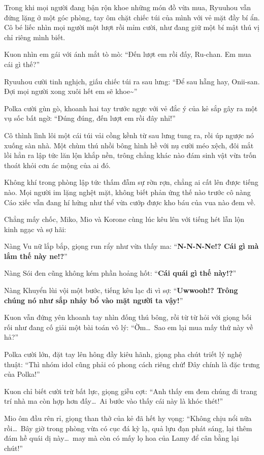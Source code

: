 \documentclass[../main.tex]{subfiles}
\begin{document}
Trong khi mọi người đang bận rộn khoe những món đồ vừa mua, Ryuuhou vẫn đứng lặng ở một góc phòng, tay ôm chặt chiếc túi của mình với vẻ mặt đầy bí ẩn. Cô bé liếc nhìn mọi người một lượt rồi mỉm cười, như đang giữ một bí mật thú vị chỉ riêng mình biết.

Kuon nhìn em gái với ánh mắt tò mò: ``Đến lượt em rồi đấy, Ru-chan. Em mua cái gì thế?''

Ryuuhou cười tinh nghịch, giấu chiếc túi ra sau lưng: ``Để sau hẵng hay, Onii-san. Đợi mọi người xong xuôi hết em sẽ khoe\~{}''

Polka cười gùn gò, khoanh hai tay trước ngực với vẻ đắc ý của kẻ sắp gây ra một vụ sốc bất ngờ: ``Đúng đúng, đến lượt em rồi đây nhỉ!''

Cô thình lình lôi một cái túi vải cồng kềnh từ sau lưng tung ra, rồi úp ngược nó xuống sàn nhà. Một chùm thú nhồi bông hình hề với nụ cười méo xệch, đôi mắt lồi hẳn ra lập tức lăn lộn khắp nền, trông chẳng khác nào đám sinh vật vừa trốn thoát khỏi cơn ác mộng của ai đó.

Không khí trong phòng lập tức thấm đẫm sự rờn rợn, chẳng ai cất lên được tiếng nào. Mọi người im lặng nghệt mặt, không biết phản ứng thế nào trước cô nàng Cáo xiếc vẫn đang hí hửng như thể vừa cướp được kho báu của vua nào đem về.

Chẳng mấy chốc, Miko, Mio và Korone cùng lúc kêu lên với tiếng hét lẫn lộn kinh ngạc và sợ hãi:

Nàng Vu nữ lắp bắp, giọng run rẩy như vừa thấy ma: ``\textbf{N-N-N-Ne!? Cái gì mà lắm thế này ne!?}''

Nàng Sói đen cũng không kém phần hoảng hốt: ``\textbf{Cái quái gì thế này!?}''

Nàng Khuyển lùi vội một bước, tiếng kêu lạc đi vì sợ: ``\textbf{Uwwooh!? Trông chúng nó như sắp nhảy bổ vào mặt người ta vậy!}''

Kuon vẫn đứng yên khoanh tay nhìn đống thú bông, rồi từ từ hỏi với giọng bối rối như đang cố giải một bài toán vô lý: ``Ờm\dots\ Sao em lại mua mấy thứ này về hả?''

Polka cười lớn, đặt tay lên hông đầy kiêu hãnh, giọng pha chút triết lý nghệ thuật: ``Thì nhóm idol cũng phải có phong cách riêng chứ! Đây chính là đặc trưng của Polka!''

Kuon chỉ biết cười trừ bất lực, giọng giễu cợt: ``Anh thấy em đem chúng đi trang trí nhà ma còn hợp hơn đấy\dots\ Ai bước vào thấy cái này là khóc thét!''

Mio ôm đầu rên rỉ, giọng than thở của kẻ đã hết hy vọng: ``Không chịu nổi nữa rồi\dots\ Bây giờ trong phòng vừa có cục đá kỳ lạ, quả lựu đạn phát sáng, lại thêm đám hề quái dị này\dots\ may mà còn có mấy lọ hoa của Lamy để cân bằng lại chút!''
\end{document}
